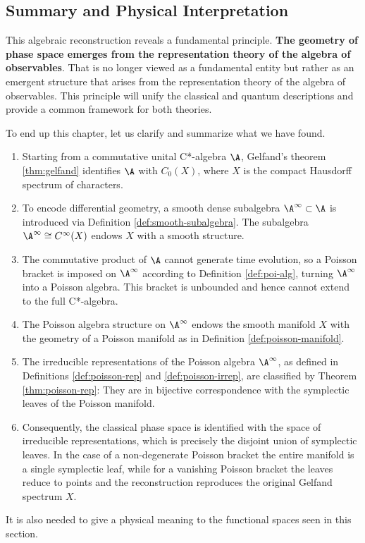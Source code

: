 \subsection*{Summary and Physical Interpretation}
This algebraic reconstruction reveals a fundamental principle. \textbf{The geometry of phase space emerges from the representation theory of the algebra of observables}. 
That is no longer viewed as a fundamental entity but rather as an emergent structure that arises from the representation theory of the algebra of observables. This principle will unify the classical and quantum descriptions and provide a common framework for both theories.

To end up this chapter, let us clarify and summarize what we have found.
\begin{enumerate}
	\item Starting from a commutative unital C*-algebra $\A$, Gelfand's theorem \ref{thm:gelfand} identifies $\A$ with $C_0(X)$, where $X$ is the compact Hausdorff spectrum of characters.
	
	\item To encode differential geometry, a smooth dense subalgebra \(\A^\infty \subset \A\) is introduced via Definition \ref{def:smooth-subalgebra}. The subalgebra \(\A^\infty \cong C^\infty(X)\) endows \(X\) with a smooth structure.
	
	\item The commutative product of $\A$ cannot generate time evolution, so a Poisson bracket is imposed on $\A^\infty$ according to Definition \ref{def:poi-alg}, turning $\A^\infty$ into a Poisson algebra. This bracket is unbounded and hence cannot extend to the full C*-algebra.
	
	\item The Poisson algebra structure on $\A^\infty$ endows the smooth manifold $X$ with the geometry of a Poisson manifold as in Definition \ref{def:poisson-manifold}. 
	
	\item The irreducible representations of the Poisson algebra $\A^\infty$, as defined in Definitions \ref{def:poisson-rep} and \ref{def:poisson-irrep}, are classified by Theorem \ref{thm:poisson-rep}: They are in bijective correspondence with the symplectic leaves of the Poisson manifold.
	
	\item Consequently, the classical phase space is identified with the space of irreducible representations, which is precisely the disjoint union of symplectic leaves. In the case of a non-degenerate Poisson bracket the entire manifold is a single symplectic leaf, while for a vanishing Poisson bracket the leaves reduce to points and the reconstruction reproduces the original Gelfand spectrum $X$.
\end{enumerate}

It is also needed to give a physical meaning to the functional spaces seen in this section.
